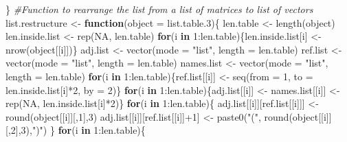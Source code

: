 \documentclass[a4paper, twoside]{templates/ociamthesis}
\newenvironment{Shaded}{\begin{snugshade}}{\end{snugshade}}
\newcommand{\AttributeTok}[1]{\textcolor[rgb]{0.77,0.63,0.00}{#1}}
\newcommand{\CommentTok}[1]{\textcolor[rgb]{0.56,0.35,0.01}{\textit{#1}}}
\newcommand{\ConstantTok}[1]{\textcolor[rgb]{0.00,0.00,0.00}{#1}}
\newcommand{\ControlFlowTok}[1]{\textcolor[rgb]{0.13,0.29,0.53}{\textbf{#1}}}
\newcommand{\DecValTok}[1]{\textcolor[rgb]{0.00,0.00,0.81}{#1}}
\newcommand{\FloatTok}[1]{\textcolor[rgb]{0.00,0.00,0.81}{#1}}
\newcommand{\FunctionTok}[1]{\textcolor[rgb]{0.00,0.00,0.00}{#1}}
\newcommand{\NormalTok}[1]{#1}
\newcommand{\OtherTok}[1]{\textcolor[rgb]{0.56,0.35,0.01}{#1}}
\newcommand{\SpecialCharTok}[1]{\textcolor[rgb]{0.00,0.00,0.00}{#1}}
\newcommand{\StringTok}[1]{\textcolor[rgb]{0.31,0.60,0.02}{#1}}
\renewenvironment{Shaded}
{
  \vspace{10pt}%
  \begin{snugshade}%
}{%
  \end{snugshade}%
  \vspace{8pt}%
}
\begin{document}
\begin{Shaded}
\begin{Highlighting}[]
\NormalTok{\}}
\CommentTok{\#Function to rearrange the list from a list of matrices to list of vectors}
\NormalTok{list.restructure }\OtherTok{\textless{}{-}} \ControlFlowTok{function}\NormalTok{(}\AttributeTok{object =}\NormalTok{ list.table}\FloatTok{.3}\NormalTok{)\{}
\NormalTok{  len.table }\OtherTok{\textless{}{-}} \FunctionTok{length}\NormalTok{(object)}
\NormalTok{  len.inside.list }\OtherTok{\textless{}{-}} \FunctionTok{rep}\NormalTok{(}\ConstantTok{NA}\NormalTok{, len.table)}
  \ControlFlowTok{for}\NormalTok{(i }\ControlFlowTok{in} \DecValTok{1}\SpecialCharTok{:}\NormalTok{len.table)\{len.inside.list[i] }\OtherTok{\textless{}{-}} \FunctionTok{nrow}\NormalTok{(object[[i]])\}}
\NormalTok{  adj.list }\OtherTok{\textless{}{-}} \FunctionTok{vector}\NormalTok{(}\AttributeTok{mode =} \StringTok{"list"}\NormalTok{, }\AttributeTok{length =}\NormalTok{ len.table)}
\NormalTok{  ref.list }\OtherTok{\textless{}{-}} \FunctionTok{vector}\NormalTok{(}\AttributeTok{mode =} \StringTok{"list"}\NormalTok{, }\AttributeTok{length =}\NormalTok{ len.table)}
\NormalTok{  names.list }\OtherTok{\textless{}{-}} \FunctionTok{vector}\NormalTok{(}\AttributeTok{mode =} \StringTok{"list"}\NormalTok{, }\AttributeTok{length =}\NormalTok{ len.table)}
  \ControlFlowTok{for}\NormalTok{(i }\ControlFlowTok{in} \DecValTok{1}\SpecialCharTok{:}\NormalTok{len.table)\{ref.list[[i]] }\OtherTok{\textless{}{-}} \FunctionTok{seq}\NormalTok{(}\AttributeTok{from =} \DecValTok{1}\NormalTok{, }\AttributeTok{to =}\NormalTok{ len.inside.list[i]}\SpecialCharTok{*}\DecValTok{2}\NormalTok{, }\AttributeTok{by =} \DecValTok{2}\NormalTok{)\}}
  \ControlFlowTok{for}\NormalTok{(i }\ControlFlowTok{in} \DecValTok{1}\SpecialCharTok{:}\NormalTok{len.table)\{adj.list[[i]] }\OtherTok{\textless{}{-}}\NormalTok{ names.list[[i]] }\OtherTok{\textless{}{-}} \FunctionTok{rep}\NormalTok{(}\ConstantTok{NA}\NormalTok{, len.inside.list[i]}\SpecialCharTok{*}\DecValTok{2}\NormalTok{)\}}
  \ControlFlowTok{for}\NormalTok{(i }\ControlFlowTok{in} \DecValTok{1}\SpecialCharTok{:}\NormalTok{len.table)\{}
\NormalTok{      adj.list[[i]][ref.list[[i]]] }\OtherTok{\textless{}{-}} \FunctionTok{round}\NormalTok{(object[[i]][,}\DecValTok{1}\NormalTok{],}\DecValTok{3}\NormalTok{)}
\NormalTok{      adj.list[[i]][ref.list[[i]]}\SpecialCharTok{+}\DecValTok{1}\NormalTok{] }\OtherTok{\textless{}{-}} \FunctionTok{paste0}\NormalTok{(}\StringTok{"("}\NormalTok{, }\FunctionTok{round}\NormalTok{(object[[i]][,}\DecValTok{2}\NormalTok{],}\DecValTok{3}\NormalTok{),}\StringTok{")"}\NormalTok{)}
\NormalTok{  \}}
  \ControlFlowTok{for}\NormalTok{(i }\ControlFlowTok{in} \DecValTok{1}\SpecialCharTok{:}\NormalTok{len.table)\{}

\end{Highlighting}
\end{Shaded}
\end{document}
